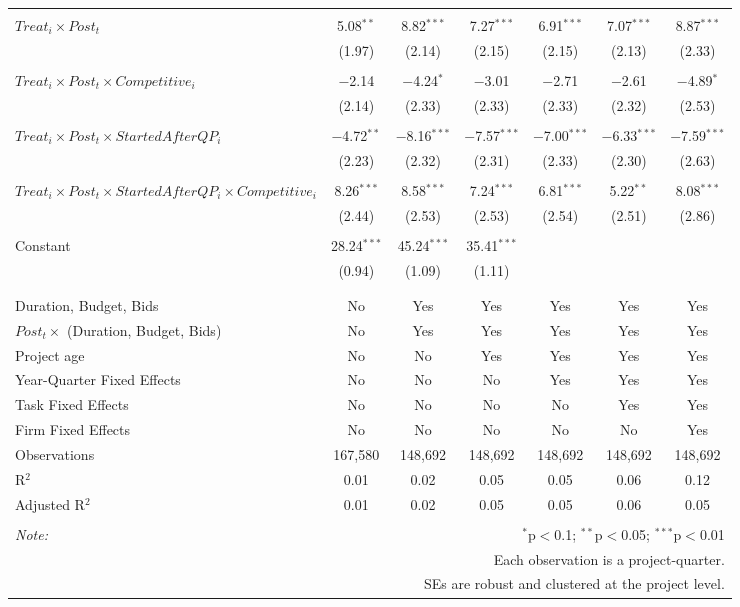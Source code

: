 \documentclass[
]{article}
\begin{document}
\begin{table}[H]
\begin{tabular}{@{\extracolsep{-3pt}}lcccccc}
  & & & & & & \\ 
 $Treat_i \times Post_t$ & 5.08$^{**}$ & 8.82$^{***}$ & 7.27$^{***}$ & 6.91$^{***}$ & 7.07$^{***}$ & 8.87$^{***}$ \\ 
  & (1.97) & (2.14) & (2.15) & (2.15) & (2.13) & (2.33) \\ 
  & & & & & & \\ 
 $Treat_i \times Post_t \times Competitive_i$ & $-$2.14 & $-$4.24$^{*}$ & $-$3.01 & $-$2.71 & $-$2.61 & $-$4.89$^{*}$ \\ 
  & (2.14) & (2.33) & (2.33) & (2.33) & (2.32) & (2.53) \\ 
  & & & & & & \\ 
 $Treat_i \times Post_t \times StartedAfterQP_i$ & $-$4.72$^{**}$ & $-$8.16$^{***}$ & $-$7.57$^{***}$ & $-$7.00$^{***}$ & $-$6.33$^{***}$ & $-$7.59$^{***}$ \\ 
  & (2.23) & (2.32) & (2.31) & (2.33) & (2.30) & (2.63) \\ 
  & & & & & & \\ 
 $Treat_i \times Post_t \times StartedAfterQP_i \times Competitive_i$ & 8.26$^{***}$ & 8.58$^{***}$ & 7.24$^{***}$ & 6.81$^{***}$ & 5.22$^{**}$ & 8.08$^{***}$ \\ 
  & (2.44) & (2.53) & (2.53) & (2.54) & (2.51) & (2.86) \\ 
  & & & & & & \\ 
 Constant & 28.24$^{***}$ & 45.24$^{***}$ & 35.41$^{***}$ &  &  &  \\ 
  & (0.94) & (1.09) & (1.11) &  &  &  \\ 
  & & & & & & \\ 
\hline \\[-1.8ex] 
Duration, Budget, Bids & No & Yes & Yes & Yes & Yes & Yes \\ 
$Post_t \times $  (Duration, Budget, Bids) & No & Yes & Yes & Yes & Yes & Yes \\ 
Project age & No & No & Yes & Yes & Yes & Yes \\ 
Year-Quarter Fixed Effects & No & No & No & Yes & Yes & Yes \\ 
Task Fixed Effects & No & No & No & No & Yes & Yes \\ 
Firm Fixed Effects & No & No & No & No & No & Yes \\ 
Observations & 167,580 & 148,692 & 148,692 & 148,692 & 148,692 & 148,692 \\ 
R$^{2}$ & 0.01 & 0.02 & 0.05 & 0.05 & 0.06 & 0.12 \\ 
Adjusted R$^{2}$ & 0.01 & 0.02 & 0.05 & 0.05 & 0.06 & 0.05 \\ 
\hline 
\hline \\[-1.8ex] 
\textit{Note:}  & \multicolumn{6}{r}{$^{*}$p$<$0.1; $^{**}$p$<$0.05; $^{***}$p$<$0.01} \\ 
 & \multicolumn{6}{r}{Each observation is a project-quarter.} \\ 
 & \multicolumn{6}{r}{SEs are robust and clustered at the project level.} \\ 
\end{tabular} 
\end{table}
\end{document}
